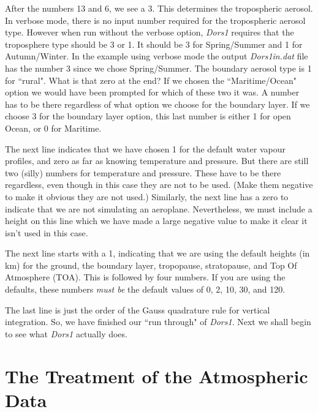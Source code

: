 \documentclass[12pt]{article}
\begin{document}
After the numbers 13 and 6, we see a 3. This determines the tropospheric aerosol.
In verbose mode, there is no input number required for the tropospheric aerosol type.
However when run without the verbose option, {\it Dors1} requires that  the troposphere type should be 3 or 1.
It should be 3 for Spring/Summer and 1 for Autumn/Winter. In the example using verbose mode
the output {\it Dors1in.dat} file has the number 3 since we chose Spring/Summer.
 The boundary aerosol type is 1 for ``rural".
What is that zero at the end? If we chosen the ``Maritime/Ocean" option we would have
been prompted for which of these two it was. A number has to be there regardless of what option
we choose for the boundary layer. If we choose 3 for the boundary layer option, this last number is
either 1 for open Ocean, or 0 for Maritime.

The next line indicates that we have chosen 1 for the default water vapour profiles, and zero
 as far as knowing temperature and pressure. But there are still two (silly) numbers for
temperature and pressure. These have to be there regardless, even though in this case
they are not to be used. (Make them negative to make it obvious they are not used.)
Similarly, the next line has a zero to indicate that we are not simulating an aeroplane.
Nevertheless, we must include a height on this line which we have made a large negative
value to make it clear it isn't used in this case.

The next line starts with a 1, indicating that we are using the default heights (in km) for
the ground, the boundary layer, tropopause, stratopause, and Top Of Atmosphere (TOA).
This is followed by four numbers. If you are using the defaults, these numbers {\it must be}
the default values of 0, 2, 10, 30, and 120.

The last line is just the order of the Gauss quadrature rule for vertical integration.
So, we have finished our ``run through" of {\it Dors1}. Next we shall begin to see what {\it Dors1}
actually does.

\section{The Treatment of the Atmospheric Data}
\end{document}
